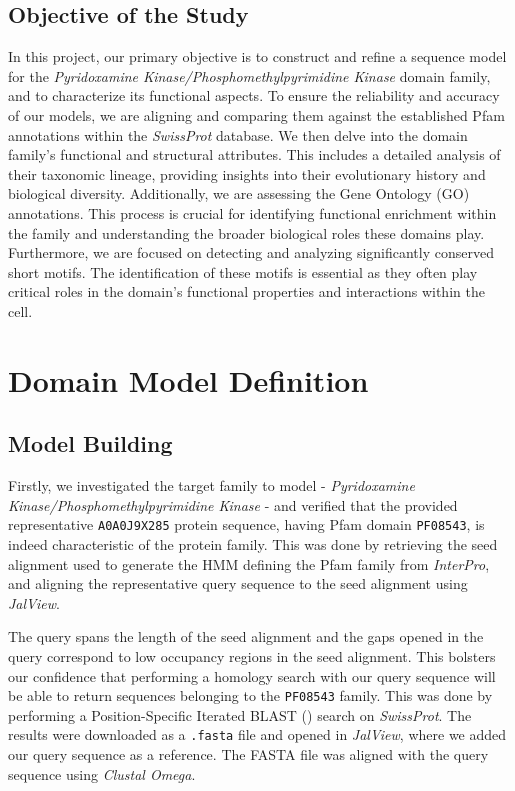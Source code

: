 \documentclass[10pt,twocolumn,letterpaper]{article}
\begin{document}
\subsection{Objective of the Study}

In this project, our primary objective is to construct and refine a sequence model for the \textit{Pyridoxamine Kinase/Phosphomethylpyrimidine Kinase} domain family, and to characterize its functional aspects. To ensure the reliability and accuracy of our models, we are aligning and comparing them against the established Pfam annotations within the \textit{SwissProt} database. We then delve into the domain family's functional and structural attributes. This includes a detailed analysis of their taxonomic lineage, providing insights into their evolutionary history and biological diversity. Additionally, we are assessing the Gene Ontology (GO) annotations. This process is crucial for identifying functional enrichment within the family and understanding the broader biological roles these domains play. Furthermore, we are focused on detecting and analyzing significantly conserved short motifs. The identification of these motifs is essential as they often play critical roles in the domain's functional properties and interactions within the cell.

\section{Domain Model Definition}

\subsection{Model Building}

Firstly, we investigated the target family to model - \textit{Pyridoxamine Kinase/Phosphomethylpyrimidine Kinase} - and verified that the provided representative \texttt{A0A0J9X285}\cite{representative_protein} protein sequence, having Pfam domain \texttt{PF08543}, is indeed characteristic of the protein family. 
This was done by retrieving the seed alignment used to generate the HMM defining the Pfam family from \textit{InterPro}, and aligning the representative query sequence to the seed alignment using \textit{JalView}.

The query spans the length of the seed alignment and the gaps opened in the query correspond to low occupancy regions in the seed alignment. This bolsters our confidence that performing a homology search with our query sequence will be able to return sequences belonging to the \texttt{PF08543} family. This was done by performing a Position-Specific Iterated BLAST () search on \textit{SwissProt}. The results were downloaded as a \texttt{.fasta} file and opened in \textit{JalView}, where we added our query sequence as a reference. The FASTA file was aligned with the query sequence using \textit{Clustal Omega}.
\end{document}
